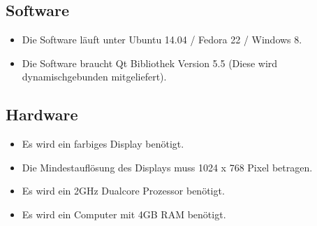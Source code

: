 \subsection{Software}
\begin{itemize}
\item Die Software läuft unter Ubuntu 14.04 / Fedora 22 / Windows 8. 
\item Die Software braucht Qt Bibliothek Version 5.5 (Diese wird dynamischgebunden mitgeliefert).
\end{itemize}
\subsection{Hardware}
\begin{itemize}
\item Es wird ein farbiges Display benötigt. 
\item Die Mindestauflösung des Displays muss 1024 x 768 Pixel betragen.
\item Es wird ein 2GHz Dualcore Prozessor benötigt.
\item Es wird ein Computer mit 4GB RAM benötigt.
\end{itemize}
